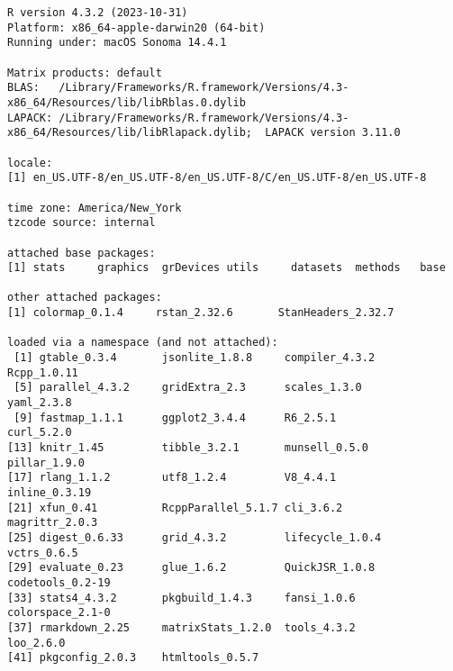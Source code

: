 \documentclass[
  letterpaper,
  DIV=11,
  numbers=noendperiod]{scrartcl}
\begin{document}
\begin{verbatim}
R version 4.3.2 (2023-10-31)
Platform: x86_64-apple-darwin20 (64-bit)
Running under: macOS Sonoma 14.4.1

Matrix products: default
BLAS:   /Library/Frameworks/R.framework/Versions/4.3-x86_64/Resources/lib/libRblas.0.dylib 
LAPACK: /Library/Frameworks/R.framework/Versions/4.3-x86_64/Resources/lib/libRlapack.dylib;  LAPACK version 3.11.0

locale:
[1] en_US.UTF-8/en_US.UTF-8/en_US.UTF-8/C/en_US.UTF-8/en_US.UTF-8

time zone: America/New_York
tzcode source: internal

attached base packages:
[1] stats     graphics  grDevices utils     datasets  methods   base     

other attached packages:
[1] colormap_0.1.4     rstan_2.32.6       StanHeaders_2.32.7

loaded via a namespace (and not attached):
 [1] gtable_0.3.4       jsonlite_1.8.8     compiler_4.3.2     Rcpp_1.0.11       
 [5] parallel_4.3.2     gridExtra_2.3      scales_1.3.0       yaml_2.3.8        
 [9] fastmap_1.1.1      ggplot2_3.4.4      R6_2.5.1           curl_5.2.0        
[13] knitr_1.45         tibble_3.2.1       munsell_0.5.0      pillar_1.9.0      
[17] rlang_1.1.2        utf8_1.2.4         V8_4.4.1           inline_0.3.19     
[21] xfun_0.41          RcppParallel_5.1.7 cli_3.6.2          magrittr_2.0.3    
[25] digest_0.6.33      grid_4.3.2         lifecycle_1.0.4    vctrs_0.6.5       
[29] evaluate_0.23      glue_1.6.2         QuickJSR_1.0.8     codetools_0.2-19  
[33] stats4_4.3.2       pkgbuild_1.4.3     fansi_1.0.6        colorspace_2.1-0  
[37] rmarkdown_2.25     matrixStats_1.2.0  tools_4.3.2        loo_2.6.0         
[41] pkgconfig_2.0.3    htmltools_0.5.7   
\end{verbatim}
\end{document}
